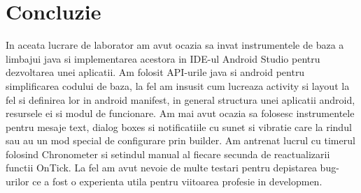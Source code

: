 \section*{Concluzie}


In aceata lucrare de laborator am avut ocazia sa invat instrumentele de baza a limbajui java si implementarea acestora in IDE-ul Android Studio pentru dezvoltarea unei aplicatii. Am folosit API-urile java si android pentru simplificarea codului de baza, la fel am insusit cum lucreaza activity si layout la fel si definirea lor in android manifest, in general structura unei aplicatii android, resursele ei si modul de funcionare. Am mai avut ocazia sa folosesc instrumentele pentru mesaje text, dialog boxes si notificatiile cu sunet si vibratie care la rindul sau au un mod special de configurare prin builder. Am antrenat lucrul cu timerul folosind Chronometer si setindul manual al fiecare secunda de reactualizarii functii OnTick. La fel am avut nevoie de multe testari pentru depistarea bug-urilor ce a fost o experienta utila pentru viitoarea profesie in developmen.

\clearpage